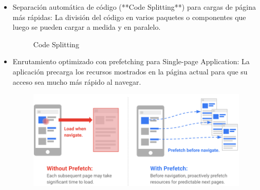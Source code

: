 \documentclass[12pt,twoside,titlepage]{report}
\begin{document}
\begin{itemize}
    \item Separación automática de código (**Code Splitting**) para cargas de página más rápidas: La división del código en varios paquetes o componentes que luego se pueden cargar a medida y en paralelo.
        \begin{figure}[H]
            \centering
            \caption{Code Splitting}
            \label{f:codesplit}
        \end{figure}
    \item Enrutamiento optimizado con prefetching para Single-page Application: La aplicación precarga los recursos mostrados en la página actual para que su acceso sea mucho más rápido al navegar.
        \begin{figure}[H]
            \centering
            \includegraphics[scale=0.45]{Nextjs/Prefetch}
            \label{fig:nextjs_prefetch}

\end{figure}
\end{itemize}
\end{document}
